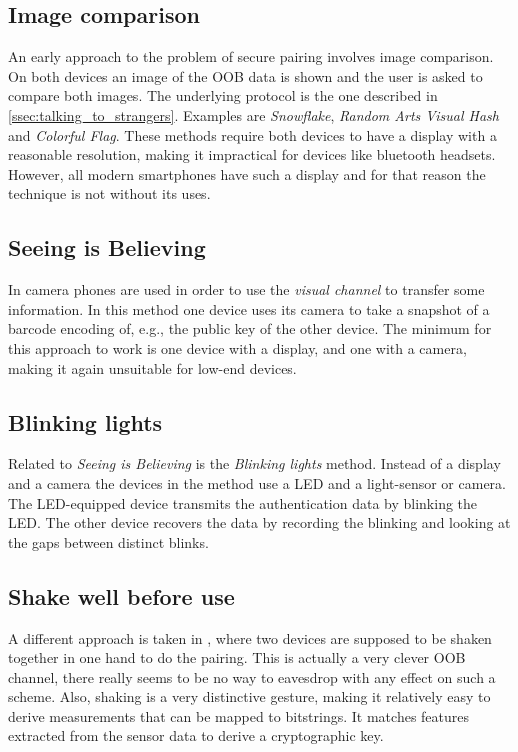 \documentclass[conference, 12pt]{sty/IEEEtran}
\begin{document}
\subsection{Image comparison}
An early approach to the problem of secure pairing involves image comparison.
On both devices an image of the OOB data is shown and the user is asked to compare both images.
The underlying protocol is the one described in \autoref{ssec:talking_to_strangers}.
Examples are \textit{Snowflake}\cite{goldberg1996visual}, \textit{Random Arts Visual Hash}\cite{perrig1999hash} and \textit{Colorful Flag}\cite{dohrmann2002public}.
These methods require both devices to have a display with a reasonable resolution, making it impractical for devices like bluetooth headsets.
However, all modern smartphones have such a display and for that reason the technique is not without its uses.

\subsection{Seeing is Believing}
In \cite{mccune2005seeing} camera phones are used in order to use the \textit{visual channel} to transfer some information.
In this method one device uses its camera to take a snapshot of a barcode encoding of, e.g., the public key of the other device.
The minimum for this approach to work is one device with a display, and one with a camera, making it again unsuitable for low-end devices.

\subsection{Blinking lights}
Related to \textit{Seeing is Believing} is the \textit{Blinking lights} method.
Instead of a display and a camera the devices in the method use a LED and a light-sensor or camera.
The LED-equipped device transmits the authentication data by blinking the LED.
The other device recovers the data by recording the blinking and looking at the gaps between distinct blinks.

\subsection{Shake well before use}
A different approach is taken in \cite{mayrhofer2009shake}, where two devices are supposed to be shaken together in one hand to do the pairing.
This is actually a very clever OOB channel, there really seems to be no way to eavesdrop with any effect on such a scheme.
Also, shaking is a very distinctive gesture, making it relatively easy to derive measurements that can be mapped to bitstrings.
It matches features extracted from the sensor data to derive a cryptographic key.
\end{document}
